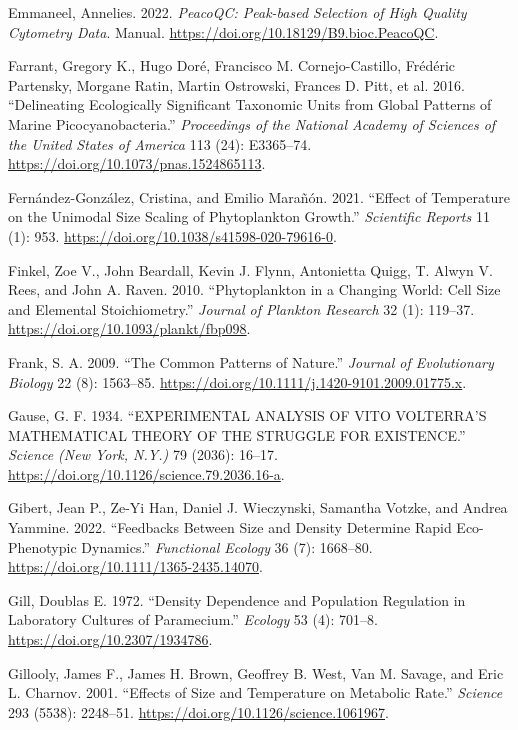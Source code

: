 \documentclass[
  letterpaper,
  DIV=11,
  numbers=noendperiod]{scrartcl}
\begin{document}
\begin{CSLReferences}
Emmaneel, Annelies. 2022. \emph{{PeacoQC}: {Peak-based} Selection of
High Quality Cytometry Data}. Manual.
\url{https://doi.org/10.18129/B9.bioc.PeacoQC}.

Farrant, Gregory K., Hugo Doré, Francisco M. Cornejo-Castillo, Frédéric
Partensky, Morgane Ratin, Martin Ostrowski, Frances D. Pitt, et al.
2016. {``Delineating Ecologically Significant Taxonomic Units from
Global Patterns of Marine Picocyanobacteria.''} \emph{Proceedings of the
National Academy of Sciences of the United States of America} 113 (24):
E3365--74. \url{https://doi.org/10.1073/pnas.1524865113}.

Fernández-González, Cristina, and Emilio Marañón. 2021. {``Effect of
Temperature on the Unimodal Size Scaling of Phytoplankton Growth.''}
\emph{Scientific Reports} 11 (1): 953.
\url{https://doi.org/10.1038/s41598-020-79616-0}.

Finkel, Zoe V., John Beardall, Kevin J. Flynn, Antonietta Quigg, T.
Alwyn V. Rees, and John A. Raven. 2010. {``Phytoplankton in a Changing
World: {Cell} Size and Elemental Stoichiometry.''} \emph{Journal of
Plankton Research} 32 (1): 119--37.
\url{https://doi.org/10.1093/plankt/fbp098}.

Frank, S. A. 2009. {``The Common Patterns of Nature.''} \emph{Journal of
Evolutionary Biology} 22 (8): 1563--85.
\url{https://doi.org/10.1111/j.1420-9101.2009.01775.x}.

Gause, G. F. 1934. {``{EXPERIMENTAL ANALYSIS OF VITO VOLTERRA}'{S
MATHEMATICAL THEORY OF THE STRUGGLE FOR EXISTENCE}.''} \emph{Science
(New York, N.Y.)} 79 (2036): 16--17.
\url{https://doi.org/10.1126/science.79.2036.16-a}.

Gibert, Jean P., Ze-Yi Han, Daniel J. Wieczynski, Samantha Votzke, and
Andrea Yammine. 2022. {``Feedbacks Between Size and Density Determine
Rapid Eco-Phenotypic Dynamics.''} \emph{Functional Ecology} 36 (7):
1668--80. \url{https://doi.org/10.1111/1365-2435.14070}.

Gill, Doublas E. 1972. {``Density {Dependence} and {Population
Regulation} in {Laboratory Cultures} of {Paramecium}.''} \emph{Ecology}
53 (4): 701--8. \url{https://doi.org/10.2307/1934786}.

Gillooly, James F., James H. Brown, Geoffrey B. West, Van M. Savage, and
Eric L. Charnov. 2001. {``Effects of {Size} and {Temperature} on
{Metabolic Rate}.''} \emph{Science} 293 (5538): 2248--51.
\url{https://doi.org/10.1126/science.1061967}.


\end{CSLReferences}
\end{document}
